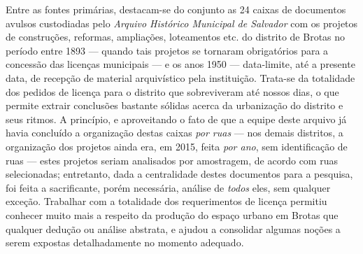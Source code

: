 Entre as fontes primárias, destacam-se do conjunto as 24 caixas de documentos avulsos custodiadas pelo \textit{Arquivo Histórico Municipal de Salvador} com os projetos de construções, reformas, ampliações, loteamentos etc. do distrito de Brotas no período entre 1893 --- quando tais projetos se tornaram obrigatórios para a concessão das licenças municipais --- e os anos 1950 --- data-limite, até a presente data, de recepção de material arquivístico pela instituição. Trata-se da totalidade dos pedidos de licença para o distrito que sobreviveram até nossos dias, o que permite extrair conclusões bastante sólidas acerca da urbanização do distrito e seus ritmos. A princípio, e aproveitando o fato de que a equipe deste arquivo já havia concluído a organização destas caixas \textit{por ruas} --- nos demais distritos, a organização dos projetos ainda era, em 2015, feita \textit{por ano}, sem identificação de ruas --- estes projetos seriam analisados por amostragem, de acordo com ruas selecionadas; entretanto, dada a centralidade destes documentos para a pesquisa, foi feita a sacrificante, porém necessária, análise de \textit{todos} eles, sem qualquer exceção. Trabalhar com a totalidade dos requerimentos de licença permitiu conhecer muito mais a respeito da produção do espaço urbano em Brotas que qualquer dedução ou análise abstrata, e ajudou a consolidar algumas noções a serem expostas detalhadamente no momento adequado.

